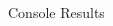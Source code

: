 \documentclass[10pt,a4paper]{article}
\begin{document}
\begin{ans}
\begin{table}[htbp]
\begin{center}
\begin{tabular}{|M{2.5cm}|M{3.5cm}|M{2cm}|M{4cm}|}
    \end{tabular}
    \end{center}
\end{table}

\begin{figure}[H]
    \caption{Console Results}
\end{figure}
 
\end{ans}
\end{document}
